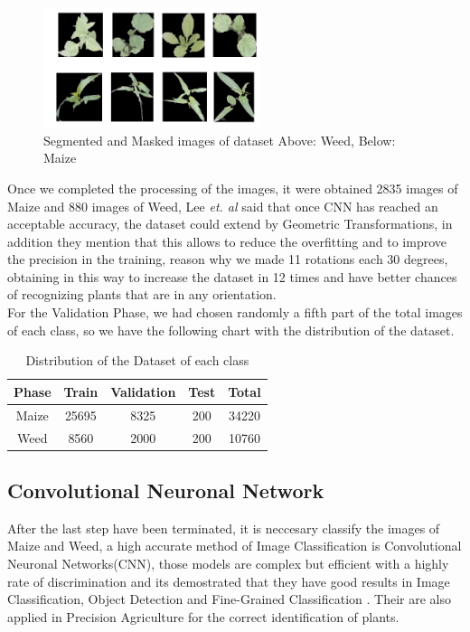 \documentclass[conference]{IEEEtran}
\begin{document}
	\begin{figure}[h]
	\centering
	\includegraphics[width=2.5in]{im1}
	\caption{ Segmented and Masked images of dataset Above: Weed, Below: Maize}
	\label{fig_sim}
	\end{figure}
	
Once we completed the processing of the images, it were obtained 2835 images of Maize and 880 images of Weed, Lee \textit{et. al} \cite{lee2015deep} said that once CNN has reached an acceptable accuracy, the dataset could extend by Geometric Transformations, in addition \cite{sladojevic2016deep}  they mention that this allows to reduce the overfitting and to improve the precision in the training, reason why we made 11 rotations each 30 degrees, obtaining in this way to increase the dataset in 12 times and have better chances of recognizing plants that are in any orientation. \\

For the Validation Phase, we had chosen randomly a fifth part of the total images of each class, so we have the following chart with the distribution of the dataset.

\begin{table}[h!]
\centering
\begin{tabular}{| c  c  c  c  c |} 
 \hline
 \textbf{Phase} & \textbf{Train} & \textbf{Validation} &\textbf{Test}  & \textbf{Total} \\ [1ex] 
 \hline
 Maize & 25695 & 8325 & 200 & 34220  \\ 
 Weed & 8560 & 2000 & 200 & 10760\\ 
 \hline
\end{tabular}
\caption{Distribution of the Dataset of each class}
\label{table:1}
\end{table}
	
	
\subsection{Convolutional Neuronal Network}
	After the last step have been terminated, it is neccesary classify the images of Maize and Weed, a high accurate method of Image Classification is Convolutional Neuronal Networks(CNN), those models are complex but efficient with a highly rate of discrimination and its demostrated that they have good results in Image Classification, Object Detection and Fine-Grained  Classification \cite{sharif2014cnn}. Their are also applied in Precision Agriculture \cite{potena2016fast} for the correct identification of plants.
\\ 
\end{document}
